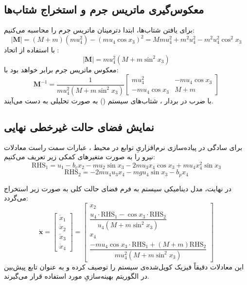 \subsection{معکوس‌گیری ماتریس جرم و استخراج شتاب‌ها}
برای یافتن شتاب‌ها، ابتدا دترمینان ماتریس جرم  را محاسبه می‌کنیم:
\[
    |\mathbf{M}| = (M+m)(m u_4^2) - (m u_4\cos x_3)^2 = M m u_4^2 + m^2 u_4^2 - m^2 u_4^2\cos^2 x_3
\]
با استفاده از اتحاد :
\[
    |\mathbf{M}| = m u_4^2(M + m\sin^2 x_3)
\]
معکوس ماتریس جرم برابر خواهد بود با:
\[
    \mathbf{M}^{-1} = \frac{1}{m u_4^2(M + m\sin^2 x_3)}
    \begin{bmatrix}
        m u_4^2        & -m u_4\cos x_3 \\
        -m u_4\cos x_3 & M+m
    \end{bmatrix}
\]
با ضرب  در بردار ، شتاب‌های سیستم () به صورت تحلیلی به دست می‌آیند.

\subsection{نمایش فضای حالت غیرخطی نهایی}
برای سادگی در پیاده‌سازی نرم‌افزاریِ توابع در محیط ، عبارات سمت راست معادلات نیرو را به صورت متغیرهای کمکی زیر تعریف می‌کنیم:
\[
    \mathrm{RHS}_1 = u_1 - b_c x_2 - m u_2\sin x_3 - 2m u_3 x_4\cos x_3 + m u_4 x_4^2\sin x_3
\]
\[
    \mathrm{RHS}_2 = -2m u_4 u_3 x_4 - mg u_4\sin x_3 - b_p x_4
\]

در نهایت، مدل دینامیکی سیستم به فرم فضای حالت کلی  به صورت زیر استخراج می‌گردد:
\[
    \renewcommand{\arraystretch}{2.2}
    \dot{\mathbf{x}} =
    \begin{bmatrix}
        \dot{x}_1 \\
        \dot{x}_2 \\
        \dot{x}_3 \\
        \dot{x}_4
    \end{bmatrix}
    =
    \begin{bmatrix}
        x_2                                                                                    \\
        \dfrac{u_4 \cdot \mathrm{RHS}_1 - \cos x_3 \cdot \mathrm{RHS}_2}{u_4(M + m\sin^2 x_3)} \\
        x_4                                                                                    \\
        \dfrac{-m u_4 \cos x_3 \cdot \mathrm{RHS}_1 + (M+m) \mathrm{RHS}_2}{m u_4^2 (M + m\sin^2 x_3)}
    \end{bmatrix}
\]
این معادلات دقیقاً فیزیک کوپل‌شده‌ی سیستم را توصیف کرده و به عنوان تابع پیش‌بین در الگوریتم بهینه‌سازیِ  مورد استفاده قرار می‌گیرند.
